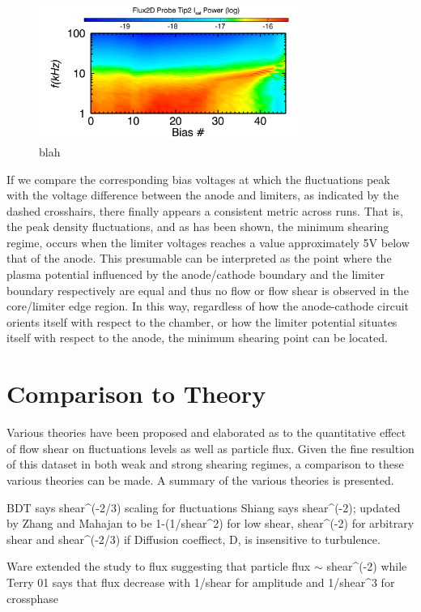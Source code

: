 \documentclass[aip,pop,amsmath,amssymb,preprint,superscriptaddress]{revtex4-1} %
\begin{document}
\begin{figure}[!htbp]
\centerline{
\includegraphics[width=8.5cm]{flux_flucs_feb12}}
\caption{\label{fig:flux_flucs_feb12} blah}
\end{figure}

If we compare the corresponding bias voltages at which the fluctuations peak with the voltage difference between the anode and limiters, as indicated by the dashed crosshairs, there finally appears a consistent metric across runs. That is, the peak density fluctuations, and as has been shown, the minimum shearing regime, occurs when the limiter voltages reaches a value approximately 5V below that of the anode. This presumable can be interpreted as the point where the plasma potential influenced by the anode/cathode boundary and the limiter boundary respectively are equal and thus no flow or flow shear is observed in the core/limiter edge region. In this way, regardless of how the anode-cathode circuit orients itself with respect to the chamber, or how the limiter potential situates itself with respect to the anode, the minimum shearing point can be located.

\section{Comparison to Theory}

Various theories have been proposed and elaborated as to the quantitative effect of flow shear on fluctuations levels as well as particle flux. Given the fine resultion of this dataset in both weak and strong shearing regimes, a comparison to these various theories can be made. A summary of the various theories is presented.

BDT says shear^(-2/3) scaling for fluctuations
Shiang says shear^(-2); updated by Zhang and Mahajan to be 1-(1/shear^2) for low shear, shear^(-2) for arbitrary shear and shear^(-2/3) if Diffusion coeffiect, D, is insensitive to turbulence.

Ware extended the study to flux suggesting that particle flux $\sim$ shear^(-2) while Terry 01 says that flux decrease with 1/shear for amplitude and 1/shear^3 for crossphase 
\end{document}
